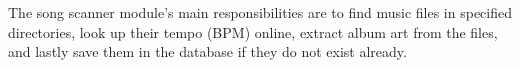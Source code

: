 

The song scanner module's main responsibilities are to find music files in specified directories, look up their tempo (BPM) online, extract album art from the files, and lastly save them in the database if they do not exist already.